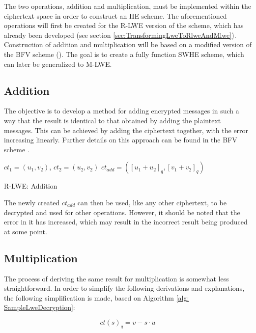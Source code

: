 The two operations, addition and multiplication, must be implemented within the ciphertext space in order to construct an HE scheme. The aforementioned operations will first be created for the R-LWE version of the scheme, which has already been developed (see section \ref{sec:TransformingLweToRlweAndMlwe}). Construction of addition and multiplication will be based on a modified version of the BFV scheme (\cite{bfv}). The goal is to create a fully function SWHE scheme, which can later be generalized to M-LWE.

\subsection*{Addition}

The objective is to develop a method for adding encrypted messages in such a way that the result is identical to that obtained by adding the plaintext messages. This can be achieved by adding the ciphertext together, with the error increasing linearly. Further details on this approach can be found in the BFV scheme \cite{bfv}. 

\begin{algorithm}[htb]
  \begin{algorithmic}[1]
    \REQUIRE $ct_1 = (u_1, v_2)$, $ct_2 = (u_2, v_2)$
    \RETURN $ct_{add} = ([u_1 + u_2]_q, [v_1 + v_2]_q)$
  \end{algorithmic}
  \caption{R-LWE: Addition}
  \label{alg:RlweAddition}
\end{algorithm}

The newly created $ct_{add}$ can then be used, like any other ciphertext, to be decrypted and used for other operations. However, it should be noted that the error in it has increased, which may result in the incorrect result being produced at some point.

\subsection*{Multiplication}

The process of deriving the same result for multiplication is somewhat less straightforward. In order to simplify the following derivations and explanations, the following simplification is made, based on Algorithm \ref{alg: SampleLweDecryption}:

\begin{equation}
  ct(s)_q = v-s\cdot u
  \label{eq:baseCt}
\end{equation}

